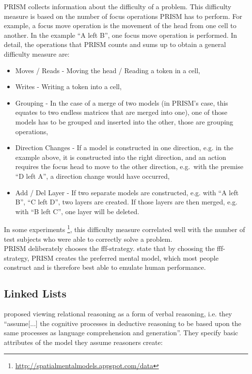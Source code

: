 \documentclass[hidelinks]{scrartcl}
\begin{document}
PRISM collects information about the difficulty of a problem. This difficulty measure is based on the number of focus operations PRISM has to perform. For example, a focus move operation is the movement of the head from one cell to another. In the example ``A left B'', one focus move operation is performed. In detail, the operations that PRISM counts and sums up to obtain a general difficulty measure are:

\begin{itemize}
\item Moves / Reads - Moving the head / Reading a token in a cell,
\item Writes - Writing a token into a cell,
\item Grouping - In the case of a merge of two models (in PRISM's case, this equates to two endless matrices that are merged into one), one of those models has to be grouped and inserted into the other, those are grouping operations,
\item Direction Changes - If a model is constructed in one direction, e.g. in the example above, it is constructed into the right direction, and an action requires the focus head to move to the other direction, e.g.\ with the premise ``D left A'', a direction change would have occurred,
\item Add / Del Layer - If two separate models are constructed, e.g. with ``A left B'', ``C left D'', two layers are created. If those layers are then merged, e.g. with ``B left C'', one layer will be deleted.
\end{itemize}

In some experiments \footnote{\url{http://spatialmentalmodels.appspot.com/data}}, this difficulty measure correlated well with the number of test subjects who were able to correctly solve a problem. \\

PRISM deliberately chooses the fff-strategy. \cite{Ragni.2013} state that by choosing the fff-strategy, PRISM creates the preferred mental model, which most people construct and is therefore best able to emulate human performance.

\subsection{Linked Lists}\label{sec:Krumnack}
\cite*{Krumnack.2011} proposed viewing relational reasoning as a form of verbal reasoning, i.e. they ``assume[...] the cognitive processes in deductive reasoning to be based upon the same processes as language comprehension and generation''. They specify basic attributes of the model they assume reasoners create:
\end{document}
